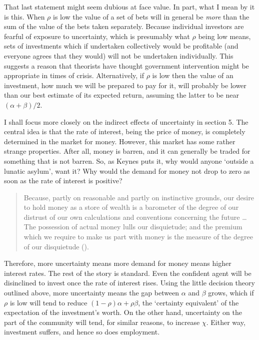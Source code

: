 \documentclass[
  10pt,
  letterpaper,
  DIV=11,
  numbers=noendperiod,
  twoside]{scrartcl}
\begin{document}
That last statement might seem dubious at face value. In part, what I
mean by it is this. When \(\rho\) is low the value of a set of bets will
in general be \emph{more} than the sum of the value of the bets taken
separately. Because individual investors are fearful of exposure to
uncertainty, which is presumably what \(\rho\) being low means, sets of
investments which if undertaken collectively would be profitable (and
everyone agrees that they would) will not be undertaken individually.
This suggests a reason that theorists have thought government
intervention might be appropriate in times of crisis. Alternatively, if
\(\rho\) is low then the value of an investment, how much we will be
prepared to pay for it, will probably be lower than our best estimate of
its expected return, assuming the latter to be near
\((\alpha + \beta) /2\).

I shall focus more closely on the indirect effects of uncertainty in
section 5. The central idea is that the rate of interest, being the
price of money, is completely determined in the market for money.
However, this market has some rather strange properties. After all,
money is barren, and it can generally be traded for something that is
not barren. So, as Keynes puts it, why would anyone `outside a lunatic
asylum', want it? Why would the demand for money not drop to zero as
soon as the rate of interest is positive?

\begin{quote}
Because, partly on reasonable and partly on instinctive grounds, our
desire to hold money as a store of wealth is a barometer of the degree
of our distrust of our own calculations and conventions concerning the
future \ldots{} The possession of actual money lulls our disquietude;
and the premium which we require to make us part with money is the
measure of the degree of our disquietude
().
\end{quote}

Therefore, more uncertainty means more demand for money means higher
interest rates. The rest of the story is standard. Even the confident
agent will be disinclined to invest once the rate of interest rises.
Using the little decision theory outlined above, more uncertainty means
the gap between \(\alpha\) and \(\beta\) grows, which if \(\rho\) is low
will tend to reduce \((1-\rho)\alpha + \rho \beta\), the `certainty
equivalent' of the expectation of the investment's worth. On the other
hand, uncertainty on the part of the community will tend, for similar
reasons, to increase \(\chi\). Either way, investment suffers, and hence
so does employment.
\end{document}
